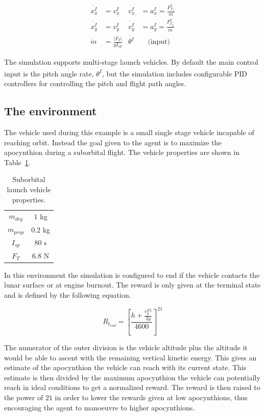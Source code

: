 \begin{align}
	\dot{x^I_x} &= v^I_x & \dot{v^I_x} &= a^I_x = \frac{F^I_{T_x}}{m} \nonumber \\ 
	\dot{x^I_y} &= v^I_y & \dot{v^I_y} &= a^I_y = \frac{F^I_{T_y}}{m} \label{eq:to_eom} \\
	\dot{m} &= \frac{|F_T|}{gI_{sp}} & \dot{\theta^I} & \quad \text{(input)} \nonumber		
\end{align}

The simulation supports multi-stage launch vehicles. By default the main control input is the pitch angle rate, $\dot{\theta^I}$, but the simulation includes configurable PID controllers for controlling the pitch and flight path angles.\newline

\subsection{The environment}
The vehicle used during this example is a small single stage vehicle incapable of reaching orbit. Instead the goal given to the agent is to maximize the apocynthion during a suborbital flight. The vehicle properties are shown in Table~\ref{tab:to_vehprop}.

\begin{table}[h!]
	\centering
	\begin{tabular}{c|c}
		\hline
		\hline
		$m_{dry}$ & $1$ \si{kg} \\
		$m_{prop}$ & $0.2$ \si{kg} \\
		$I_{sp}$  & $80$ \si{s} \\
		$F_T$ & $6.8$ \si{N}		
	\end{tabular}
	\caption{Suborbital launch vehicle properties.}
	\label{tab:to_vehprop}
\end{table}

In this environment the simulation is configured to end if the vehicle contacts the lunar surface or at engine burnout. The reward is only given at the terminal state and is defined by the following equation.

\begin{equation}
	R_{t_{end}} = \left[ \frac{h + \frac{v^{E2}_y}{2g}}{4600} \right]^{21}
\end{equation}

The numerator of the outer division is the vehicle altitude plus the altitude it would be able to ascent with the remaining vertical kinetic energy. This gives an estimate of the apocynthion the vehicle can reach with its current state. This estimate is then divided by the maximum apocynthion the vehicle can potentially reach in ideal conditions to get a normalized reward. The reward is then raised to the power of $21$ in order to lower the rewards given at low apocynthions, thus encouraging the agent to manoeuvre to higher apocynthions.

